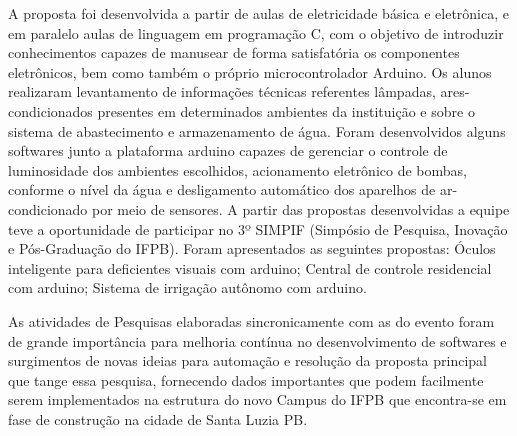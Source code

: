 
A proposta foi desenvolvida a partir de aulas de eletricidade básica e eletrônica, e em paralelo aulas de linguagem em programação C, com o objetivo de introduzir conhecimentos capazes de manusear de forma satisfatória os componentes eletrônicos, bem como também o próprio microcontrolador Arduino. Os alunos realizaram levantamento de informações técnicas referentes lâmpadas, ares-condicionados presentes em determinados ambientes da instituição e sobre o sistema de abastecimento e armazenamento de água. Foram desenvolvidos alguns softwares junto a plataforma arduino capazes de gerenciar o controle de luminosidade dos ambientes escolhidos, acionamento eletrônico de bombas, conforme o nível da água e desligamento automático dos aparelhos de ar-condicionado por meio de sensores. A partir das propostas desenvolvidas a equipe teve a oportunidade de participar  no 3º SIMPIF (Simpósio de Pesquisa, Inovação e Pós-Graduação do IFPB). Foram apresentados as seguintes propostas: Óculos inteligente para deficientes visuais com arduino; Central de controle residencial com arduino; Sistema de irrigação autônomo com arduino.\par 
As atividades de Pesquisas elaboradas sincronicamente com as do evento foram de grande importância para melhoria contínua no desenvolvimento de softwares e surgimentos de novas ideias para automação e resolução da proposta principal que tange essa pesquisa, fornecendo dados importantes que podem facilmente serem implementados na estrutura do novo Campus do IFPB que encontra-se em fase de construção na cidade de Santa Luzia PB.



